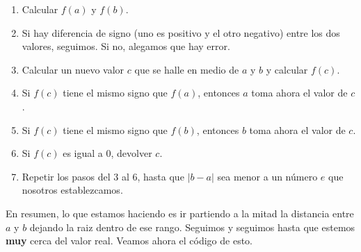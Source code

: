 \documentclass[10pt,letterpaper]{article}
\begin{document}
\begin{enumerate}
\item Calcular $f \left( a \right)$ y $f \left( b \right)$.
\item Si hay diferencia de signo (uno es positivo y el otro negativo) entre los dos valores, seguimos. Si no, alegamos que hay error.
\item Calcular un nuevo valor $c$ que se halle en medio de $a$ y $b$ y calcular $f \left( c \right)$.
\item Si $f \left( c \right)$ tiene el mismo signo que $f \left( a \right)$, entonces $a$ toma ahora el valor de $c$.
\item Si $f \left( c \right)$ tiene el mismo signo que $f \left( b \right)$, entonces $b$ toma ahora el valor de $c$.
\item Si $f \left( c \right)$ es igual a $0$, devolver $c$.
\item Repetir los pasos del 3 al 6, hasta que $\left| b - a \right|$ sea menor a un n\'umero $e$ que nosotros establezcamos.
\end{enumerate}

En resumen, lo que estamos haciendo es ir partiendo a la mitad la distancia entre $a$ y $b$ dejando la raiz dentro de ese rango. Seguimos y seguimos hasta que estemos \textbf{muy} cerca del valor real. Veamos ahora el c\'odigo de esto.
\end{document}

